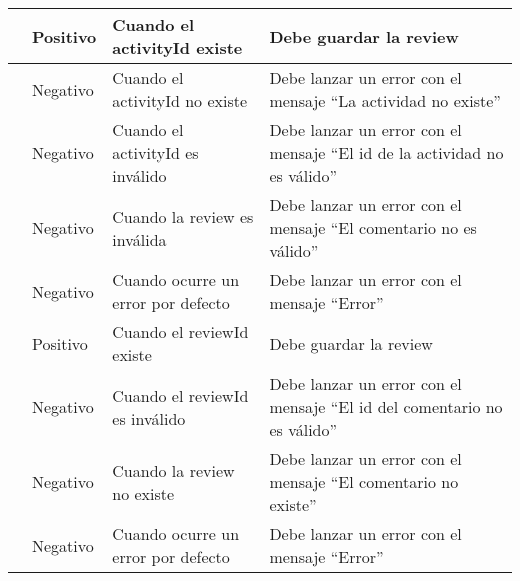 \begin{small}
\begin{longtable}[H]{|>{\centering\arraybackslash}m{3cm}|>{\centering\arraybackslash}m{2cm}|>{\centering\arraybackslash}m{3cm}|>{\centering\arraybackslash}m{4cm}|}
		\multirow{5}{4cm}{Add review}                   & Positivo              & Cuando el activityId existe                        & Debe guardar la review                                                          \\
		\cline{2-4}
		                                                & Negativo              & Cuando el activityId no existe                     & Debe lanzar un error con el mensaje “La actividad no existe”                    \\
		\cline{2-4}
		                                                & Negativo              & Cuando el activityId es inválido                   & Debe lanzar un error con el mensaje “El id de la actividad no es válido”        \\
		\cline{2-4}
		                                                & Negativo              & Cuando la review es inválida                       & Debe lanzar un error con el mensaje “El comentario no es válido”                \\
		\cline{2-4}
		                                                & Negativo              & Cuando ocurre un error por defecto                 & Debe lanzar un error con el mensaje “Error”                                     \\
		\hline

		\multirow{4}{4cm}{Edit review}                  & Positivo              & Cuando el reviewId existe                          & Debe guardar la review                                                          \\
		\cline{2-4}
		                                                & Negativo              & Cuando el reviewId es inválido                     & Debe lanzar un error con el mensaje “El id del comentario no es válido”         \\
		\cline{2-4}
		                                                & Negativo              & Cuando la review no existe                         & Debe lanzar un error con el mensaje “El comentario no existe”                   \\
		\cline{2-4}
		                                                & Negativo              & Cuando ocurre un error por defecto                 & Debe lanzar un error con el mensaje “Error”                                     \\
		\hline


\end{longtable}
\end{small}
